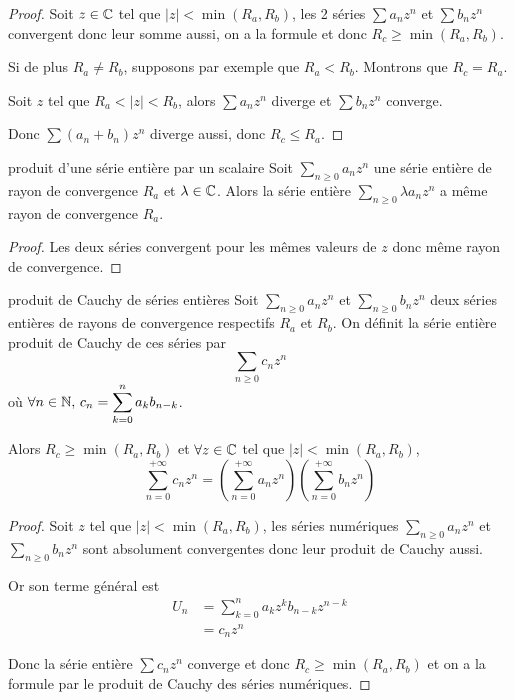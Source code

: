 \begin{proof}
    Soit $z \in \mathbb{C}$ tel que $|z| < \min(R_a, R_b)$, les 2 séries $\sum a_n z^n$ et $\sum b_n z^n$ 
    convergent donc leur somme aussi, on a la formule et donc $R_c \geqslant \min(R_a, R_b)$.

    Si de plus $R_a \neq R_b$, supposons par exemple que $R_a < R_b$. Montrons que $R_c = R_a$.

    Soit $z $ tel que $R_a < |z| < R_b$, alors $\sum a_n z^n$ diverge et $\sum b_n z^n$ converge.

    Donc $\sum (a_n + b_n) z^n$ diverge aussi, donc $R_c \leqslant R_a$.
\end{proof}

\begin{proposition}{produit d'une série entière par un scalaire}{}
    Soit $\sum_{n \geqslant 0} a_n z^n$ une série entière de rayon de convergence $R_a$ et
    $\lambda \in \mathbb{C}$. Alors la série entière $\sum_{n \geqslant 0} \lambda a_n z^n$ a même 
    rayon de convergence $R_a$.
\end{proposition}

\begin{proof}
    Les deux séries convergent pour les mêmes valeurs de $z$ donc même rayon de convergence.
\end{proof}

\begin{theoreme}{produit de Cauchy de séries entières}{}
    Soit $\sum_{n \geqslant 0} a_n z^n$ et $\sum_{n \geqslant 0} b_n z^n$ deux séries entières 
    de rayons de convergence respectifs $R_a$ et $R_b$. On définit la série entière produit de Cauchy 
    de ces séries par 
    $$\sum_{n \geqslant 0} c_n z^n$$ 
    où $\displaystyle \forall n \in \mathbb{N}, \, c_n = \sum_{k = 0}^n a_k b_{n - k}$.

    Alors $R_c \geqslant \min(R_a, R_b)$ et $\forall z \in \mathbb{C}$ tel que $|z| < \min(R_a, R_b)$, 
    $$\sum_{n = 0}^{+\infty} c_n z^n = \left( \sum_{n = 0}^{+\infty} a_n z^n \right) \left( \sum_{n = 0}^{+\infty} b_n z^n \right)$$
\end{theoreme}

\begin{proof}
    Soit $z$ tel que $|z| < \min(R_a, R_b)$, les séries numériques $\sum_{n \geqslant 0} a_n z^n$ 
    et $\sum_{n \geqslant 0} b_n z^n$ sont absolument convergentes donc leur produit de Cauchy 
    aussi. 

    Or son terme général est 
    \begin{align}
        U_n & = \sum_{k = 0}^n a_k z^k b_{n - k} z^{n - k} \\
        & = c_n z^n
    \end{align}

    Donc la série entière $\sum c_n z^n$ converge et donc $R_c \geqslant \min(R_a, R_b)$ et 
    on a la formule par le produit de Cauchy des séries numériques.
\end{proof}

